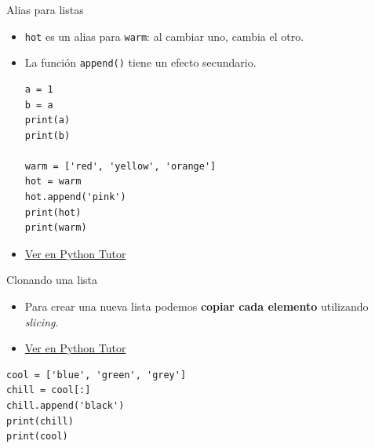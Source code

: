 \documentclass[mathserif]{beamer}
\begin{document}
\begin{frame}[fragile]{Alias para listas}
    \begin{itemize}
        \item \lstinline|hot| es un alias para \lstinline|warm|: al cambiar uno, cambia el otro.
        
        \item La función \lstinline|append()| tiene un {\blue efecto secundario.}

\begin{lstlisting}
a = 1
b = a
print(a)
print(b)

warm = ['red', 'yellow', 'orange']
hot = warm
hot.append('pink')
print(hot)
print(warm)
\end{lstlisting}

        \item \href{http://pythontutor.com/visualize.html#code=a%20%3D%201%0Ab%20%3D%20a%0Aprint%28a%29%0Aprint%28b%29%0A%0Awarm%20%3D%20%5B'red',%20'yellow',%20'orange'%5D%0Ahot%20%3D%20warm%0Ahot.append%28'pink'%29%0Aprint%28hot%29%0Aprint%28warm%29&cumulative=false&curInstr=0&heapPrimitives=nevernest&mode=display&origin=opt-frontend.js&py=3&rawInputLstJSON=%5B%5D&textReferences=false}{Ver en Python Tutor}
        

    \end{itemize}
\end{frame}


\begin{frame}[fragile]{Clonando una lista}
    \begin{itemize}
        \item Para crear una nueva lista podemos {\blue\bfseries copiar cada elemento} utilizando \textit{slicing}. 
        
        \item \href{http://pythontutor.com/visualize.html#code=cool%20%3D%20%5B'blue',%20'green',%20'grey'%5D%0Achill%20%3D%20cool%5B%3A%5D%0Achill.append%28'black'%29%0Aprint%28chill%29%0Aprint%28cool%29&cumulative=false&heapPrimitives=nevernest&mode=edit&origin=opt-frontend.js&py=3&rawInputLstJSON=%5B%5D&textReferences=false}{Ver en Python Tutor}
    \end{itemize}
\begin{lstlisting}
cool = ['blue', 'green', 'grey']
chill = cool[:]
chill.append('black')
print(chill)
print(cool)
\end{lstlisting}
\end{frame}
\end{document}

